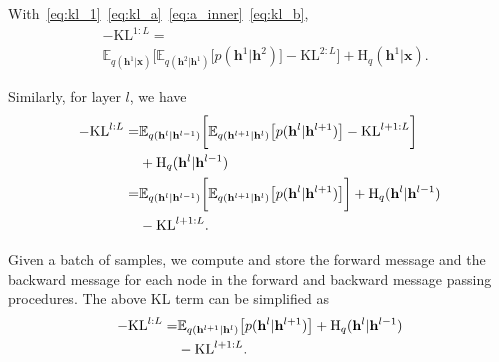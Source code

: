 \documentclass[conference]{IEEEtran}
\begin{document}
With~\eqref{eq:kl_1}~\eqref{eq:kl_a}~\eqref{eq:a_inner}~\eqref{eq:kl_b}, 
\begin{align*}
&-\text{KL}^{1:L} = \\
&    \mathbb{E}_{q(\mathbf{h}^{1}|\mathbf{x})} \bigg[  \mathbb{E}_{q(\mathbf{h}^{2}|\mathbf{h}^1)} \big[  p( \mathbf{h}^{1}|  \mathbf{h}^{2})    \big]  - \text{KL}^{2:L}  \bigg] +  \text{H}_q(\mathbf{h}^{1}|\mathbf{x}).
\end{align*}

Similarly, for layer $l$, we  have 
\begin{align*} %
-\text{KL}^{l:L} 
=  & \mathbb{E}_{q(\mathbf{h}^{l}|\mathbf{h}^{l-1})} \bigg[  \mathbb{E}_{q(\mathbf{h}^{l+1}|\mathbf{h}^l)} \big[  p( \mathbf{h}^{l}|  \mathbf{h}^{l+1})    \big]  - \text{KL}^{l+1:L}  \bigg] \\ \notag
& +  \text{H}_q(\mathbf{h}^{l}|\mathbf{h}^{l-1}) \\ \notag
=&    \mathbb{E}_{q(\mathbf{h}^{l}|\mathbf{h}^{l-1})} \bigg[  \mathbb{E}_{q(\mathbf{h}^{l+1}|\mathbf{h}^l)} \big[  p( \mathbf{h}^{l}|  \mathbf{h}^{l+1})    \big]   \bigg] +  \text{H}_q(\mathbf{h}^{l}|\mathbf{h}^{l-1}) \\ \notag
& - \text{KL}^{l+1:L}.
\end{align*}

Given a batch of samples, we compute  and store the forward message and the backward message for each node in the forward and backward message passing procedures.  The above KL term can be simplified as
\begin{align} \label{eq:KL_tree}
-\text{KL}^{l:L} 
=&     \mathbb{E}_{q(\mathbf{h}^{l+1}|\mathbf{h}^l)} \big[  p( \mathbf{h}^{l}|  \mathbf{h}^{l+1})    \big]  +  \text{H}_q(\mathbf{h}^{l}|\mathbf{h}^{l-1}) \\ \notag
& - \text{KL}^{l+1:L}.
\end{align}
\end{document}
